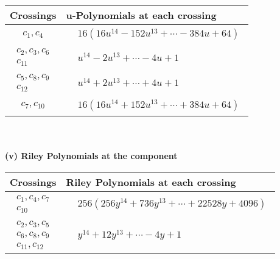 \documentclass[1p]{elsarticle_modified}
\theoremstyle{definition}
\begin{document}
\begin{tabular}{m{50pt}|m{274pt}}
Crossings & \hspace{64pt}u-Polynomials at each crossing \\
\hline $$\begin{aligned}c_{1},c_{4}\end{aligned}$$&$\begin{aligned}
&16(16 u^{14}-152 u^{13}+\cdots-384 u+64)
\end{aligned}$\\
\hline $$\begin{aligned}c_{2},c_{3},c_{6}\\c_{11}\end{aligned}$$&$\begin{aligned}
&u^{14}-2 u^{13}+\cdots-4 u+1
\end{aligned}$\\
\hline $$\begin{aligned}c_{5},c_{8},c_{9}\\c_{12}\end{aligned}$$&$\begin{aligned}
&u^{14}+2 u^{13}+\cdots+4 u+1
\end{aligned}$\\
\hline $$\begin{aligned}c_{7},c_{10}\end{aligned}$$&$\begin{aligned}
&16(16 u^{14}+152 u^{13}+\cdots+384 u+64)
\end{aligned}$\\
\hline
\end{tabular}\\~\\
\newpage\renewcommand{\arraystretch}{1}
\flushleft \textbf{(v) Riley Polynomials at the component}\newline \\
\begin{tabular}{m{50pt}|m{274pt}}
Crossings & \hspace{64pt}Riley Polynomials at each crossing \\
\hline $$\begin{aligned}c_{1},c_{4},c_{7}\\c_{10}\end{aligned}$$&$\begin{aligned}
&256(256 y^{14}+736 y^{13}+\cdots+22528 y+4096)
\end{aligned}$\\
\hline $$\begin{aligned}c_{2},c_{3},c_{5}\\c_{6},c_{8},c_{9}\\c_{11},c_{12}\end{aligned}$$&$\begin{aligned}
&y^{14}+12 y^{13}+\cdots-4 y+1
\end{aligned}$\\
\hline
\end{tabular}\\~\\
\end{document}
